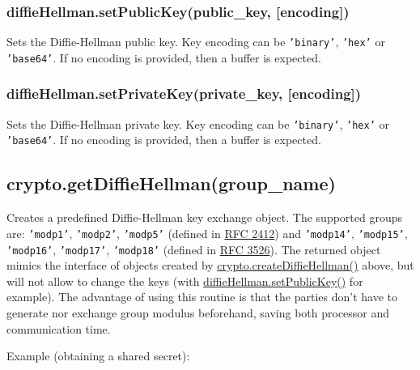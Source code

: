 \subsubsection{diffieHellman.setPublicKey(public\_key,
{[}encoding{]})}\label{diffiehellman.setpublickeypublicux5fkey-encoding}

Sets the Diffie-Hellman public key. Key encoding can be
\texttt{'binary'}, \texttt{'hex'} or \texttt{'base64'}. If no encoding
is provided, then a buffer is expected.

\subsubsection{diffieHellman.setPrivateKey(private\_key,
{[}encoding{]})}\label{diffiehellman.setprivatekeyprivateux5fkey-encoding}

Sets the Diffie-Hellman private key. Key encoding can be
\texttt{'binary'}, \texttt{'hex'} or \texttt{'base64'}. If no encoding
is provided, then a buffer is expected.

\subsection{crypto.getDiffieHellman(group\_name)}\label{crypto.getdiffiehellmangroupux5fname}

Creates a predefined Diffie-Hellman key exchange object. The supported
groups are: \texttt{'modp1'}, \texttt{'modp2'}, \texttt{'modp5'}
(defined in \href{http://www.rfc-editor.org/rfc/rfc2412.txt}{RFC 2412})
and \texttt{'modp14'}, \texttt{'modp15'}, \texttt{'modp16'},
\texttt{'modp17'}, \texttt{'modp18'} (defined in
\href{http://www.rfc-editor.org/rfc/rfc3526.txt}{RFC 3526}). The
returned object mimics the interface of objects created by
\hyperref[cryptoux5fcryptoux5fcreatediffiehellmanux5fprimeux5fencoding]{crypto.createDiffieHellman()}
above, but will not allow to change the keys (with
\hyperref[cryptoux5fdiffiehellmanux5fsetpublickeyux5fpublicux5fkeyux5fencoding]{diffieHellman.setPublicKey()}
for example). The advantage of using this routine is that the parties
don't have to generate nor exchange group modulus beforehand, saving
both processor and communication time.

Example (obtaining a shared secret):

